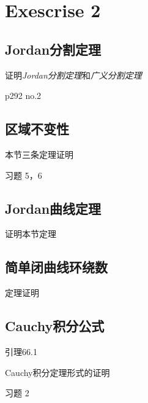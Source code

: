 \chapter{Exescrise 2}

\section{Jordan分割定理}

证明\textsl{Jordan分割定理}和\textsl{广义分割定理}

p292 no.2

\section{区域不变性}

本节三条定理证明

习题 5，6

\section{Jordan曲线定理}

证明本节定理

\section{简单闭曲线环绕数}
定理证明

\section{Cauchy积分公式}

引理66.1

Cauchy积分定理形式的证明

习题 2
